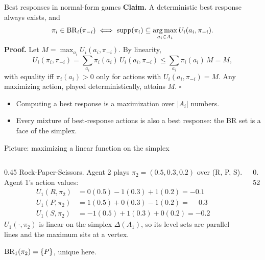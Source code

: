 \documentclass[aspectratio=169,11pt]{beamer}
\begin{document}
\begin{frame}{Best responses in normal-form games}
  \textbf{Claim.} A deterministic best response always exists, and
  \[
    \pi_i \in \operatorname{BR}_i(\pi_{-i}) \iff \operatorname{supp}(\pi_i) \subseteq \operatorname*{arg\,max}_{a_i \in A_i} U_i(a_i, \pi_{-i}).
  \]
  \textbf{Proof.} Let $M = \max_{a_i} U_i(a_i, \pi_{-i})$. By linearity,
  \[
    U_i(\pi_i, \pi_{-i}) = \sum_{a_i} \pi_i(a_i)\, U_i(a_i, \pi_{-i}) \le \sum_{a_i} \pi_i(a_i)\, M = M,
  \]
  with equality iff $\pi_i(a_i) > 0$ only for actions with $U_i(a_i, \pi_{-i}) = M$. Any maximizing action, played deterministically, attains $M$. \hfill $\square$
  \bigskip

  \begin{itemize}
    \item Computing a best response is a maximization over $|A_i|$ numbers.
    \item Every mixture of best-response actions is also a best response: the BR set is a face of the simplex.
  \end{itemize}
\end{frame}

\begin{frame}{Picture: maximizing a linear function on the simplex}
  \begin{columns}[c]
    \begin{column}{0.45\textwidth}
      Rock-Paper-Scissors. Agent 2 plays $\pi_2 = (0.5, 0.3, 0.2)$ over (R, P, S). Agent 1's action values:
      \begin{align*}
        U_1(R, \pi_2) &= 0(0.5) - 1(0.3) + 1(0.2) = -0.1 \\
        U_1(P, \pi_2) &= 1(0.5) + 0(0.3) - 1(0.2) = \phantom{-}0.3 \\
        U_1(S, \pi_2) &= -1(0.5) + 1(0.3) + 0(0.2) = -0.2
      \end{align*}
      $U_1(\cdot, \pi_2)$ is linear on the simplex $\Delta(A_1)$, so its level sets are parallel lines and the maximum sits at a vertex.
      \medskip

      $\operatorname{BR}_1(\pi_2) = \{P\}$, unique here.
    \end{column}
    \begin{column}{0.52\textwidth}
      \centering
      
    \end{column}
  \end{columns}
\end{frame}
\end{document}
